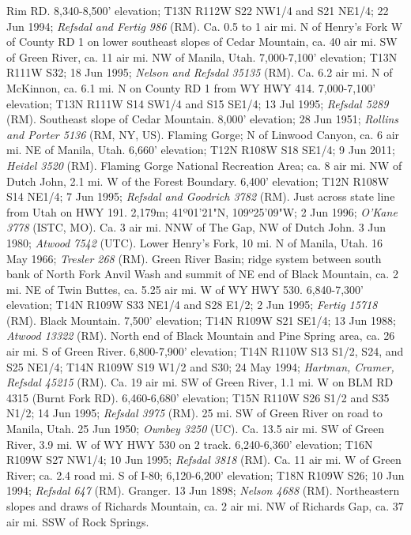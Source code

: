 Rim RD. 8,340-8,500' elevation; T13N R112W S22 NW1/4 and S21 NE1/4;
22 Jun 1994; \textit{Refsdal and Fertig 986} (RM).
Ca. 0.5 to 1 air mi. N of Henry's Fork W of County RD 1 on lower southeast
slopes of Cedar Mountain, ca. 40 air mi. SW of Green River, ca. 11 air mi. NW
of Manila, Utah. 7,000-7,100' elevation; T13N R111W S32; 18 Jun 1995;
\textit{Nelson and Refsdal 35135} (RM).
Ca. 6.2 air mi. N of McKinnon, ca. 6.1 mi. N on County RD 1 from WY HWY 414.
7,000-7,100' elevation; T13N R111W S14 SW1/4 and S15 SE1/4; 13 Jul 1995;
\textit{Refsdal 5289} (RM).
Southeast slope of Cedar Mountain. 8,000' elevation; 28 Jun 1951;
\textit{Rollins and Porter 5136} (RM, NY, US).
Flaming Gorge; N of Linwood Canyon, ca. 6 air mi. NE of Manila, Utah. 6,660'
elevation; T12N R108W S18 SE1/4; 9 Jun 2011; \textit{Heidel 3520} (RM).
Flaming Gorge National Recreation Area; ca. 8 air mi. NW of Dutch John, 2.1 mi.
W of the Forest Boundary. 6,400' elevation; T12N R108W S14 NE1/4; 7 Jun 1995;
\textit{Refsdal and Goodrich 3782} (RM).
Just across state line from Utah on HWY 191. 2,179m; 41º01'21"N, 109º25'09"W;
2 Jun 1996; \textit{O'Kane 3778} (ISTC, MO).
Ca. 3 air mi. NNW of The Gap, NW of Dutch John. 3 Jun 1980;
\textit{Atwood 7542} (UTC).
Lower Henry's Fork, 10 mi. N of Manila, Utah. 16 May 1966;
\textit{Tresler 268} (RM).
Green River Basin; ridge system between south bank of North Fork Anvil Wash and
summit of NE end of Black Mountain, ca. 2 mi. NE of Twin Buttes, ca. 5.25 air mi.
W of WY HWY 530. 6,840-7,300' elevation; T14N R109W S33 NE1/4 and S28 E1/2;
2 Jun 1995; \textit{Fertig 15718} (RM).
Black Mountain. 7,500' elevation; T14N R109W S21 SE1/4; 13 Jun 1988;
\textit{Atwood 13322} (RM).
North end of Black Mountain and Pine Spring area, ca. 26 air mi. S of Green
River. 6,800-7,900' elevation; T14N R110W S13 S1/2, S24, and S25 NE1/4;
T14N R109W S19 W1/2 and S30; 24 May 1994;
\textit{Hartman, Cramer, Refsdal 45215} (RM).
Ca. 19 air mi. SW of Green River, 1.1 mi. W on BLM RD 4315 (Burnt Fork RD).
6,460-6,680' elevation; T15N R110W S26 S1/2 and S35 N1/2;
14 Jun 1995; \textit{Refsdal 3975} (RM).
25 mi. SW of Green River on road to Manila, Utah. 25 Jun 1950;
\textit{Ownbey 3250} (UC).
Ca. 13.5 air mi. SW of Green River, 3.9 mi. W of WY HWY 530 on 2 track.
6,240-6,360' elevation; T16N R109W S27 NW1/4; 10 Jun 1995;
\textit{Refsdal 3818} (RM).
Ca. 11 air mi. W of Green River; ca. 2.4 road mi. S of I-80;
6,120-6,200' elevation; T18N R109W S26; 10 Jun 1994; \textit{Refsdal 647} (RM).
Granger. 13 Jun 1898; \textit{Nelson 4688} (RM).
Northeastern slopes and draws of Richards Mountain,
ca. 2 air mi. NW of Richards Gap, ca. 37 air mi. SSW of Rock Springs.
